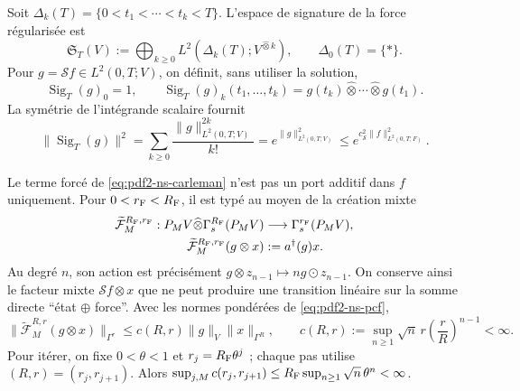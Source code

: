 Soit $\Delta_k(T)=\{0<t_1<\cdots<t_k<T\}$. L'espace de signature de la force
régularisée est
\begin{equation}\label{eq:pdf2-ns-signature-space}
 \mathfrak S_T(V):=\bigoplus_{k\geq0}L^2(\Delta_k(T);V^{\widehat\otimes k}),
 \qquad \Delta_0(T)=\{*\}.
\end{equation}
Pour $g=\mathscr Sf\in L^2(0,T;V)$, on définit, sans utiliser la solution,
\begin{equation}\label{eq:pdf2-ns-force-signature}
 \operatorname{Sig}_T(g)_0=1,
 \qquad
 \operatorname{Sig}_T(g)_k(t_1,\ldots,t_k)
 =g(t_k)\widehat\otimes\cdots\widehat\otimes g(t_1).
\end{equation}
La symétrie de l'intégrande scalaire fournit
\begin{equation}\label{eq:pdf2-ns-signature-norm}
 \|\operatorname{Sig}_T(g)\|^2
 =\sum_{k\geq0}\frac{\|g\|_{L^2(0,T;V)}^{2k}}{k!}
 =e^{\|g\|_{L^2(0,T;V)}^2}
 \le e^{c_{\mathscr S}^2\|f\|_{L^2(0,T;F)}^2}.
\end{equation}

Le terme forcé de \eqref{eq:pdf2-ns-carleman} n'est pas un port additif dans
$f$ uniquement. Pour $0<r_{\rm F}<R_{\rm F}$, il est typé au moyen de la création mixte
\begin{equation}\label{eq:pdf2-ns-mixed-creation}
 \begin{aligned}
 \widetilde{\mathcal F}^{R_{\rm F},r_{\rm F}}_M:
 P_MV\widehat\otimes\Gamma_s^{R_{\rm F}}(P_MV)
 &\longrightarrow\Gamma_s^{r_{\rm F}}(P_MV),\\
 \widetilde{\mathcal F}^{R_{\rm F},r_{\rm F}}_M(g\otimes x)
 &:=a^\dagger(g)x.
 \end{aligned}
\end{equation}
Au degré $n$, son action est précisément
$g\otimes z_{n-1}\mapsto n g\odot z_{n-1}$. On conserve ainsi le facteur mixte
$\mathscr Sf\otimes x$ que ne peut produire une transition linéaire sur la somme directe
``état $\oplus$ force''.
Avec les normes pondérées de \eqref{eq:pdf2-ns-pcf},
\begin{equation}\label{eq:pdf2-ns-creation-uniform}
 \|\widetilde{\mathcal F}^{R,r}_M(g\otimes x)\|_{\Gamma^r}
 \le c(R,r)\|g\|_V\|x\|_{\Gamma^R},
 \qquad
 c(R,r):=\sup_{n\ge1}\sqrt n\,r\left(\frac rR\right)^{n-1}<\infty.
\end{equation}
Pour itérer, on fixe $0<\theta<1$ et $r_j=R_{\rm F}\theta^j$ ; chaque pas utilise
$(R,r)=(r_j,r_{j+1})$. Alors
$\sup_{j,M}c(r_j,r_{j+1})\le
R_{\rm F}\sup_{n\ge1}\sqrt n\,\theta^n<\infty$.

